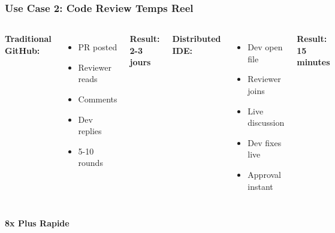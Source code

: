 \documentclass[aspectratio=16:9]{beamer}
\begin{document}
\begin{frame}
  \frametitle{Use Case 2: Code Review Temps Reel}
  
  \begin{columns}[T]
    
    \textbf{Traditional GitHub:}
    \begin{itemize}
      \item PR posted
      \item Reviewer reads
      \item Comments
      \item Dev replies
      \item 5-10 rounds
    \end{itemize}
    
    \textbf{Result: 2-3 jours}
    
    
    \textbf{Distributed IDE:}
    \begin{itemize}
      \item Dev open file
      \item Reviewer joins
      \item Live discussion
      \item Dev fixes live
      \item Approval instant
    \end{itemize}
    
    \textbf{Result: 15 minutes}
  \end{columns}
  
  \vspace{0.5cm}
  
  \centering\Large\textcolor{SuccessGreen}{\textbf{8x Plus Rapide}}
\end{frame}
\end{document}
